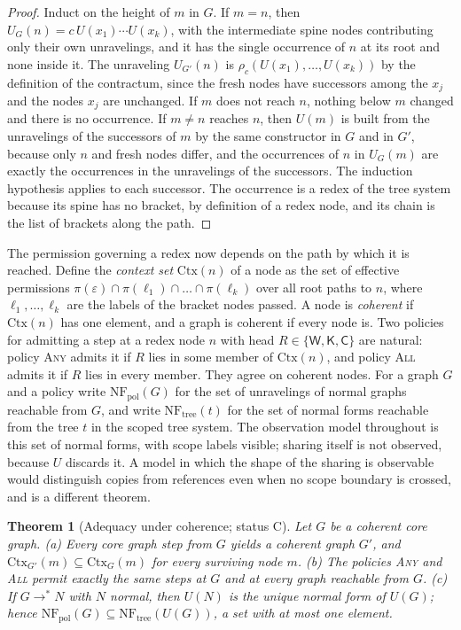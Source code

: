 \documentclass[11pt]{article}
\newtheorem{theorem}{Theorem}[section]
\theoremstyle{definition}
\theoremstyle{remark}
\newcommand{\cC}{\mathsf{C}}
\newcommand{\cK}{\mathsf{K}}
\newcommand{\cW}{\mathsf{W}}
\newcommand{\Ctx}{\mathrm{Ctx}}
\newcommand{\NF}{\mathrm{NF}}
\newcommand{\Ct}{status C}
\begin{document}
\begin{proof}
Induct on the height of $m$ in $G$. If $m=n$, then $U_G(n)=c\,U(x_1)\cdots U(x_k)$, with the intermediate spine nodes contributing only their own unravelings, and it has the single occurrence of $n$ at its root and none inside it. The unraveling $U_{G'}(n)$ is $\rho_c(U(x_1),\dots,U(x_k))$ by the definition of the contractum, since the fresh nodes have successors among the $x_j$ and the nodes $x_j$ are unchanged. If $m$ does not reach $n$, nothing below $m$ changed and there is no occurrence. If $m\ne n$ reaches $n$, then $U(m)$ is built from the unravelings of the successors of $m$ by the same constructor in $G$ and in $G'$, because only $n$ and fresh nodes differ, and the occurrences of $n$ in $U_G(m)$ are exactly the occurrences in the unravelings of the successors. The induction hypothesis applies to each successor. The occurrence is a redex of the tree system because its spine has no bracket, by definition of a redex node, and its chain is the list of brackets along the path.
\end{proof}

The permission governing a redex now depends on the path by which it is reached. Define the \emph{context set} $\Ctx(n)$ of a node as the set of effective permissions $\pi(\varepsilon)\cap\pi(\ell_1)\cap\dots\cap\pi(\ell_k)$ over all root paths to $n$, where $\ell_1,\dots,\ell_k$ are the labels of the bracket nodes passed. A node is \emph{coherent} if $\Ctx(n)$ has one element, and a graph is coherent if every node is. Two policies for admitting a step at a redex node $n$ with head $R\in\{\cW,\cK,\cC\}$ are natural: policy \textsc{Any} admits it if $R$ lies in some member of $\Ctx(n)$, and policy \textsc{All} admits it if $R$ lies in every member. They agree on coherent nodes. For a graph $G$ and a policy write $\NF_{\mathrm{pol}}(G)$ for the set of unravelings of normal graphs reachable from $G$, and write $\NF_{\mathrm{tree}}(t)$ for the set of normal forms reachable from the tree $t$ in the scoped tree system. The observation model throughout is this set of normal forms, with scope labels visible; sharing itself is not observed, because $U$ discards it. A model in which the shape of the sharing is observable would distinguish copies from references even when no scope boundary is crossed, and is a different theorem.

\begin{theorem}[Adequacy under coherence; \Ct]\label{thm:adequacy}
Let $G$ be a coherent core graph. (a) Every core graph step from $G$ yields a coherent graph $G'$, and $\Ctx_{G'}(m)\subseteq\Ctx_G(m)$ for every surviving node $m$. (b) The policies \textsc{Any} and \textsc{All} permit exactly the same steps at $G$ and at every graph reachable from $G$. (c) If $G\to^{*}N$ with $N$ normal, then $U(N)$ is the unique normal form of $U(G)$; hence $\NF_{\mathrm{pol}}(G)\subseteq\NF_{\mathrm{tree}}(U(G))$, a set with at most one element.
\end{theorem}
\end{document}
